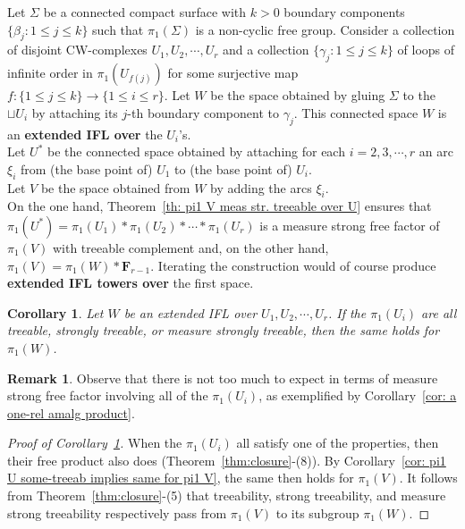 \documentclass[11pt]{amsart}
\theoremstyle{definition}
\newtheorem{remark}[definition]{Remark}
\theoremstyle{plain}
\newtheorem{corollary}[definition]{Corollary}
\newcommand{\<}{\langle}
\renewcommand{\>}{\rangle}
\newcommand{\suchthat}{\colon}
\newcommand{\FF}{\mathbf{F}}
\newcommand{\define}[1]{\textbf{#1}}
\begin{document}
Let $\Sigma$ be a connected compact surface with $k> 0$ boundary components $\{\beta_j \suchthat 1\leq j \leq k\}$ such that $\pi_1(\Sigma)$ is a non-cyclic free group. Consider a collection of disjoint CW-complexes $U_1, U_2, \cdots, U_r$ and a collection  $\{\gamma_j \suchthat 1\leq j \leq k\}$ of loops of infinite order in $\pi_1(U_{f(j)})$ for some surjective map $f:\{1\leq j \leq k\}\to \{1\leq i\leq r\}$.
Let $W$ be the space obtained by gluing $\Sigma$ to the $\sqcup U_i$ by attaching its $j$-th boundary component to $\gamma_j$.
This connected space $W$ is an \define{extended IFL over} the $U_i$'s.
\\
Let $U^*$ be the connected space obtained by attaching for each $i=2, 3, \cdots, r$ an arc $\xi_i$ from (the base point of) $U_1$ to (the base point of)  $U_i$.
\\
Let $V$ be the space obtained from $W$ by adding the arcs $\xi_i$.
\\
On the one hand, Theorem~\ref{th: pi1 V meas str. treeable over U} ensures that $\pi_1(U^*)=\pi_1(U_1)*\pi_1(U_2)*\cdots *\pi_1(U_r)$ is a measure strong free factor of $\pi_1(V)$ with treeable complement and, on the other hand, $\pi_1(V)=\pi_1(W)*\FF_{r-1}$.
Iterating the construction would of course produce \define{extended IFL towers over} the first space.



\begin{corollary}\label{cor: extended etage-treeability}
Let $W$ be an extended IFL over $U_1, U_2, \cdots, U_r$.
If the $\pi_1(U_i)$ are all treeable, strongly treeable, or measure strongly treeable, then the same holds for  $\pi_1(W)$.
\end{corollary}
\begin{remark}\label{rem:no measure strong free factor for extended tower}
Observe that there is not too much to expect in terms of measure strong free factor involving all of the
$\pi_1(U_i)$, as exemplified by Corollary~\ref{cor: a one-rel amalg product}.
\end{remark}

\begin{proof}[Proof of Corollary~\ref{cor: extended etage-treeability}]
When the $\pi_1(U_i)$ all satisfy one of the properties, then their free product also does (Theorem~\ref{thm:closure}-(8)).
By Corollary~\ref{cor: pi1 U some-treeab implies same for pi1 V},
 the same then holds for $\pi_1(V)$.
It follows from Theorem~\ref{thm:closure}-(5) that
treeability,  strong treeability, and  measure strong treeability respectively
pass from $\pi_1(V)$ to its subgroup $\pi_1(W)$.
\end{proof}
\end{document}
